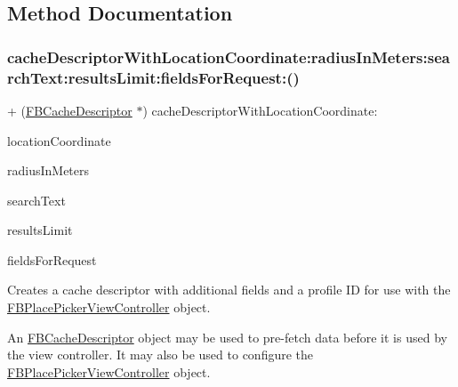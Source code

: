 \subsection{Method Documentation}
\mbox{\label{interfaceFBPlacePickerViewController_ab8216b73fcd5d1bea32fc317d38e05ce}} 
\subsubsection{\texorpdfstring{cache\+Descriptor\+With\+Location\+Coordinate\+:radius\+In\+Meters\+:search\+Text\+:results\+Limit\+:fields\+For\+Request\+:()}{cacheDescriptorWithLocationCoordinate:radiusInMeters:searchText:resultsLimit:fieldsForRequest:()}\hspace{0.1cm}{\footnotesize\ttfamily [1/5]}}
{\footnotesize\ttfamily + (\hyperlink{interfaceFBCacheDescriptor}{F\+B\+Cache\+Descriptor} $\ast$) cache\+Descriptor\+With\+Location\+Coordinate\+: \begin{DoxyParamCaption}\item[{(C\+L\+Location\+Coordinate2D)}]{location\+Coordinate }\item[{radiusInMeters:(N\+S\+Integer)}]{radius\+In\+Meters }\item[{searchText:(N\+S\+String $\ast$)}]{search\+Text }\item[{resultsLimit:(N\+S\+Integer)}]{results\+Limit }\item[{fieldsForRequest:(N\+S\+Set $\ast$)}]{fields\+For\+Request }\end{DoxyParamCaption}}

Creates a cache descriptor with additional fields and a profile ID for use with the {\ttfamily \hyperlink{interfaceFBPlacePickerViewController}{F\+B\+Place\+Picker\+View\+Controller}} object.

An {\ttfamily \hyperlink{interfaceFBCacheDescriptor}{F\+B\+Cache\+Descriptor}} object may be used to pre-\/fetch data before it is used by the view controller. It may also be used to configure the {\ttfamily \hyperlink{interfaceFBPlacePickerViewController}{F\+B\+Place\+Picker\+View\+Controller}} object.


